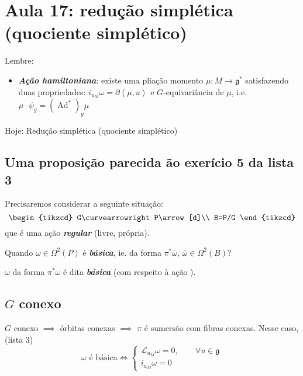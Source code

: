 \section{Aula 17: redução simplética (quociente simplético)}

Lembre:
\begin{itemize}
\item \textit{\textbf{Ação hamiltoniana}}: existe uma pliação momento $\mu:M\longrightarrow \mathfrak{g}^*$ satisfazendo duas propriedades: $i_{u_M}\omega=\partial \left<\mu,u\right> $ e $G$-equivariância de $\mu$, i.e. $\mu\cdot \psi_g=(\operatorname{Ad}^*)_g\mu$
\end{itemize}

Hoje: Redução simplética (quociente simplético)

\subsection{Uma proposição parecida ão exerício 5 da lista 3}

Precisaremos considerar a seguinte situação:
\[\begin{tikzcd}
G\curvearrowright P\arrow[d]\\
B=P/G
\end{tikzcd}\]
que é uma ação \textit{\textbf{regular}} (livre, própria).

\begin{question}\leavevmode
	Quando $\omega\in\Omega^{2}(P)$ é \textit{\textbf{básica}}, ie. da forma $\pi^*\bar{\omega}$, $\bar{\omega} \in\Omega^{2}(B)$?
\end{question}

\begin{defn}\leavevmode
	$\omega$ da forma $\pi^*\omega$ é dita \textit{\textbf{básica}} (com respeito à ação ).
\end{defn}

\subsection{$G$ conexo}


\begin{remark}\leavevmode
	$G$ conexo $\implies $ órbitas conexas $\implies $ $\pi$ é sumersão com fibras conexas. Nesse caso, (lista 3)
	\[\omega\text{ é básica} \iff\begin{cases}
		\mathcal{L}_{u_M}\omega=0,\qquad \forall u\in\mathfrak{g}\\
		i_{u_M}\omega=0
	\end{cases}\]
\end{remark}

